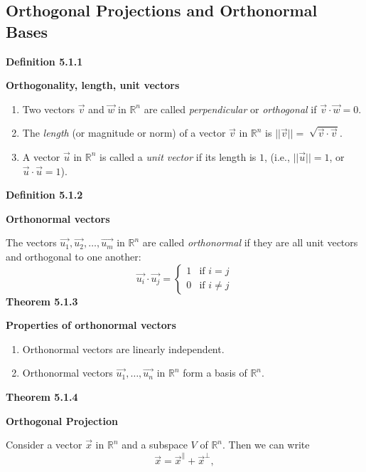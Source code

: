 \subsection{Orthogonal Projections and Orthonormal Bases}
\textbf{Definition 5.1.1}\\
\par\noindent\textbf{Orthogonality, length, unit vectors}
\renewcommand{\labelenumi}{\textbf{\alph{enumi}.}}
\begin{enumerate}
\item Two vectors $\vec{v}$ and $\vec{w}$ in $\mathbb{R}^{n}$ are called \textit{perpendicular} or \textit{orthogonal} if $\vec{v}\cdot\vec{w}=0$.
\item The \textit{length} (or magnitude or norm) of a vector $\vec{v}$ in $\mathbb{R}^{n}$ is $||\vec{v}||=\sqrt[]{\vec{v}\cdot\vec{v}}$.
\item A vector $\vec{u}$ in $\mathbb{R}^{n}$ is called a \textit{unit vector} if its length is $1$, (i.e., $||\vec{u}||=1$, or $\vec{u}\cdot\vec{u}=1$).
\end{enumerate}
\textbf{Definition 5.1.2}\\
\par\noindent\textbf{Orthonormal vectors}
\par\noindent The vectors $\vec{u_{1}},\vec{u_{2}},\ldots{},\vec{u_{m}}$ in $\mathbb{R}^{n}$ are called \textit{orthonormal} if they are all unit vectors and orthogonal to one another:
\[\vec{u_{i}}\cdot{}\vec{u_{j}}=\begin{cases}1 & \textrm{if }i=j\\ 0 & \textrm{if } i\ne{}j\end{cases}\]
\textbf{Theorem 5.1.3}\\
\par\noindent\textbf{Properties of orthonormal vectors}
\renewcommand{\labelenumi}{\textbf{\alph{enumi}.}}
\begin{enumerate}
\item Orthonormal vectors are linearly independent.
\item Orthonormal vectors $\vec{u_{1}},\ldots{},\vec{u_{n}}$ in $\mathbb{R}^{n}$ form a basis of $\mathbb{R}^{n}$.
\end{enumerate}
\textbf{Theorem 5.1.4}\\
\par\noindent\textbf{Orthogonal Projection}
\par\noindent Consider a vector $\vec{x}$ in $\mathbb{R}^{n}$ and a subspace $V$ of $\mathbb{R}^{n}$. Then we can write
\[\vec{x}=\vec{x}^{\parallel}+\vec{x}^{\perp},\]
